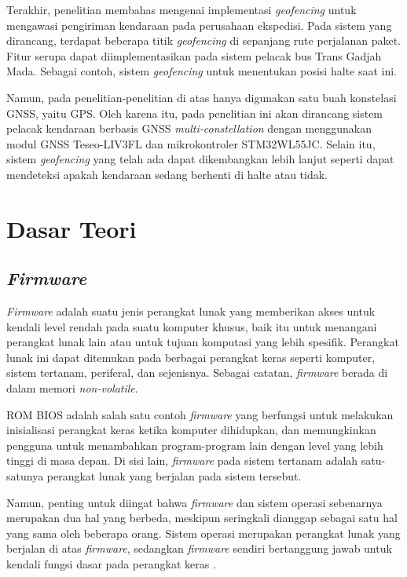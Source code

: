 Terakhir, penelitian \cite{Priono2017} membahas mengenai implementasi \textit{geofencing} untuk mengawasi pengiriman kendaraan pada perusahaan ekspedisi. Pada sistem yang dirancang, terdapat beberapa titik \textit{geofencing} di sepanjang rute perjalanan paket. Fitur serupa dapat diimplementasikan pada sistem pelacak bus Trans Gadjah Mada. Sebagai contoh, sistem \textit{geofencing} untuk menentukan posisi halte saat ini.

Namun, pada penelitian-penelitian di atas hanya digunakan satu buah konstelasi GNSS, yaitu GPS. Oleh karena itu, pada penelitian ini akan dirancang sistem pelacak kendaraan berbasis GNSS \textit{multi-constellation} dengan menggunakan modul GNSS Teseo\hyp{}LIV3FL dan mikrokontroler STM32WL55JC. Selain itu, sistem \textit{geofencing} yang telah ada dapat dikembangkan lebih lanjut seperti dapat mendeteksi apakah kendaraan sedang berhenti di halte atau tidak.

\section{Dasar Teori}
\subsection{\textit{Firmware}}
\textit{Firmware} adalah suatu jenis perangkat lunak yang memberikan akses untuk kendali level rendah pada suatu komputer khusus, baik itu untuk menangani perangkat lunak lain atau untuk tujuan komputasi yang lebih spesifik. Perangkat lunak ini dapat ditemukan pada berbagai perangkat keras seperti komputer, sistem tertanam, periferal, dan sejenisnya. Sebagai catatan, \textit{firmware} berada di dalam memori \textit{non-volatile}.

ROM BIOS adalah salah satu contoh \textit{firmware} yang berfungsi untuk melakukan inisialisasi perangkat keras ketika komputer dihidupkan, dan memungkinkan pengguna untuk menambahkan program-program lain dengan level yang lebih tinggi di masa depan. Di sisi lain, \textit{firmware} pada sistem tertanam adalah satu-satunya perangkat lunak yang berjalan pada sistem tersebut.

Namun, penting untuk diingat bahwa \textit{firmware} dan sistem operasi sebenarnya merupakan dua hal yang berbeda, meskipun seringkali dianggap sebagai satu hal yang sama oleh beberapa orang. Sistem operasi merupakan perangkat lunak yang berjalan di atas \textit{firmware}, sedangkan \textit{firmware} sendiri bertanggung jawab untuk kendali fungsi dasar pada perangkat keras \cite{Davidson1978}.


